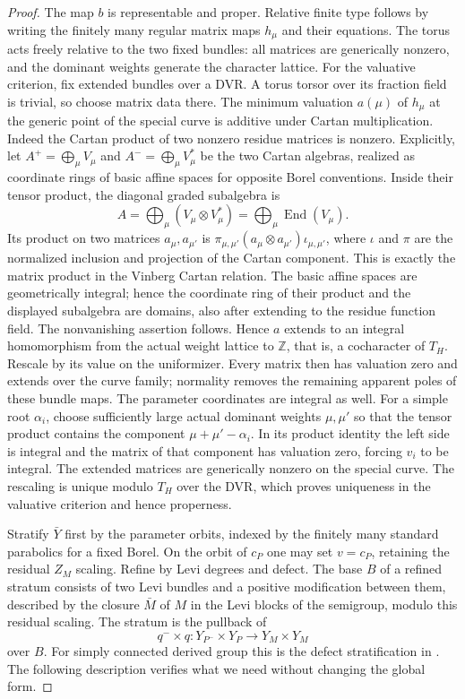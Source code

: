 \begin{proof}
The map $b$ is representable and proper.  Relative finite type follows by
writing the finitely many regular matrix maps $h_\mu$ and their equations.
The torus acts freely relative to the two fixed bundles: all matrices are
generically nonzero, and the dominant weights generate the character
lattice.  For the valuative criterion, fix extended bundles over a DVR.
A torus torsor over its fraction field is trivial, so choose matrix data
there.  The minimum valuation $a(\mu)$ of $h_\mu$ at the generic point of
the special curve is additive under Cartan multiplication.  Indeed the
Cartan product of two nonzero residue matrices is nonzero.  Explicitly,
let $A^+=\bigoplus_\mu V_\mu$ and
$A^-=\bigoplus_\mu V_\mu^*$ be the two Cartan algebras, realized as
coordinate rings of basic affine spaces for opposite Borel conventions.
Inside their tensor product, the diagonal graded subalgebra is
\[
 A=\bigoplus_\mu(V_\mu\otimes V_\mu^*)
   =\bigoplus_\mu\operatorname{End}(V_\mu).
\]
Its product on two matrices $a_\mu,a_{\mu'}$ is
$\pi_{\mu,\mu'}(a_\mu\otimes a_{\mu'})\iota_{\mu,\mu'}$, where
$\iota$ and $\pi$ are the normalized inclusion and projection of the
Cartan component.  This is exactly the matrix product in the Vinberg
Cartan relation.  The basic affine spaces are geometrically integral;
hence the coordinate ring of their product and the displayed subalgebra
are domains, also after
extending to the residue function field.  The nonvanishing assertion
follows.  Hence $a$ extends to
an integral homomorphism from the actual weight lattice to $\mathbb Z$,
that is, a cocharacter of $T_H$.  Rescale by its value on the uniformizer.
Every matrix then has valuation zero and extends over the curve family;
normality removes the remaining apparent poles of these bundle maps.
The parameter coordinates are integral as well.  For a simple root
$\alpha_i$, choose sufficiently large actual dominant weights $\mu,\mu'$
so that the tensor product contains the component
$\mu+\mu'-\alpha_i$.  In its product identity the left side is integral
and the matrix of that component has valuation zero, forcing $v_i$ to be
integral.  The extended matrices are generically nonzero on the special
curve.  The rescaling is unique modulo $T_H$ over the DVR, which proves
uniqueness in the valuative criterion and hence properness.

Stratify $\bar Y$ first by the parameter orbits, indexed by the finitely
many standard parabolics for a fixed Borel.
On the orbit of $c_P$ one may set $v=c_P$, retaining the residual $Z_M$
scaling.  Refine by Levi degrees and defect.  The base $B$ of a refined
stratum consists of two Levi bundles and a positive modification between
them, described by the closure $\bar M$ of $M$ in the Levi blocks of the
semigroup, modulo this residual scaling.  The stratum is the pullback of
\begin{equation}\label{eq:M5}
 q^-\times q:Y_{P^-}\times Y_P\longrightarrow Y_M\times Y_M
\end{equation}
over $B$.  For simply connected derived group this is the defect
stratification in \cite[Proposition~3.2.2]{SchiederVinberg}.  The following
description verifies what we need without changing the global form.


\end{proof}
